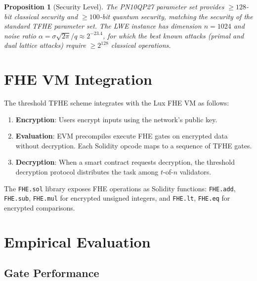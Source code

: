 \documentclass[11pt,a4paper]{article}
\newtheorem{proposition}[theorem]{Proposition}
\begin{document}
\begin{proposition}[Security Level]
\label{prop:security}
The PN10QP27 parameter set provides $\geq 128$-bit classical security and $\geq 100$-bit
quantum security, matching the security of the standard TFHE parameter set.
The LWE instance has dimension $n = 1024$ and noise ratio $\alpha = \sigma\sqrt{2\pi}/q \approx 2^{-23.4}$,
for which the best known attacks (primal and dual lattice attacks) require $\geq 2^{128}$
classical operations.
\end{proposition}

\section{FHE VM Integration}
\label{sec:fhevm}

The threshold TFHE scheme integrates with the Lux FHE VM as follows:

\begin{enumerate}[nosep]
\item \textbf{Encryption}: Users encrypt inputs using the network's public key.
\item \textbf{Evaluation}: EVM precompiles execute FHE gates on encrypted data without
decryption. Each Solidity opcode maps to a sequence of TFHE gates.
\item \textbf{Decryption}: When a smart contract requests decryption, the threshold
decryption protocol distributes the task among $t$-of-$n$ validators.
\end{enumerate}

The \texttt{FHE.sol} library exposes FHE operations as Solidity functions:
\texttt{FHE.add}, \texttt{FHE.sub}, \texttt{FHE.mul} for encrypted unsigned integers,
and \texttt{FHE.lt}, \texttt{FHE.eq} for encrypted comparisons.

\section{Empirical Evaluation}
\label{sec:evaluation}

\subsection{Gate Performance}
\end{document}
